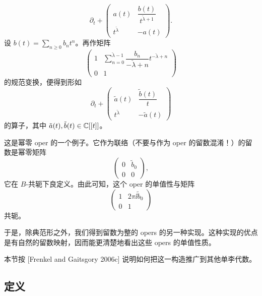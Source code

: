\[
\partial_t + \begin{pmatrix} a(t) & \dfrac{b(t)}{t^{\check\lambda+1}}\\[3pt] t^{\check\lambda} & -a(t)\end{pmatrix}.
\]
设 $b(t) = \sum_{n\ge 0}b_nt^n$。再作矩阵
\[
\begin{pmatrix} 1 & \sum_{n=0}^{\check\lambda-1}\dfrac{b_n}{-\check\lambda+n}t^{-\check\lambda+n}\\[3pt] 0 & 1\end{pmatrix}
\]
的规范变换，便得到形如
\[
\partial_t + \begin{pmatrix} \tilde a(t) & \dfrac{\tilde b(t)}{t}\\[3pt] t^{\check\lambda} & -\tilde a(t)\end{pmatrix}
\]
的算子，其中 $\tilde a(t),\tilde b(t)\in\mathbb{C}[[t]]$。

这是幂零 oper 的一个例子。它作为联络（不要与作为 oper 的留数混淆！）的留数是幂零矩阵
\[
\begin{pmatrix} 0 & \tilde b_0\\ 0 & 0\end{pmatrix},
\]
它在 $B$-共轭下良定义。由此可知，这个 oper 的单值性与矩阵
\[
\begin{pmatrix} 1 & 2\pi\ii\tilde b_0\\ 0 & 1\end{pmatrix}
\]
共轭。


于是，除典范形之外，我们得到留数为整的 opers 的另一种实现。这种实现的优点是有自然的留数映射，因而能更清楚地看出这些 opers 的单值性质。

本节按 [Frenkel and Gaitsgory 2006c] 说明如何把这一构造推广到其他单李代数。

\subsection{定义}

